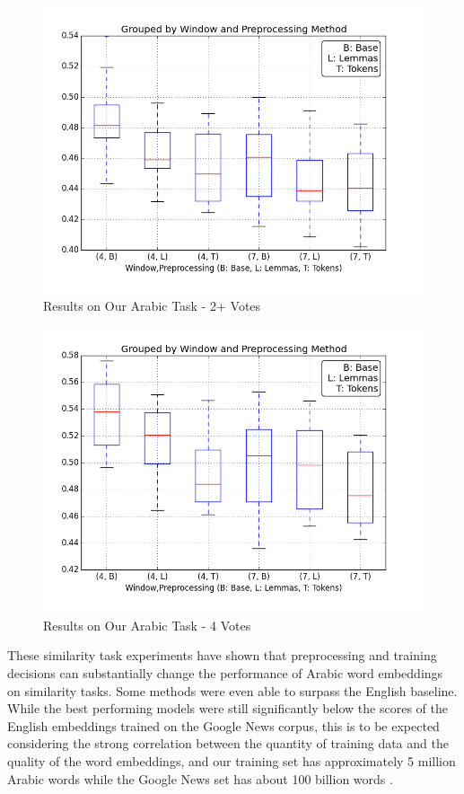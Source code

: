 \begin{figure}
  \includegraphics[width=\linewidth]{results_spearman/ar_similiarity_task_multi_results_spearplot.png}
  \caption{Results on Our Arabic Task - 2+ Votes}
  \label{fig:spearplot2}
\end{figure}

\begin{figure}
  \includegraphics[width=\linewidth]{results_spearman/ar_similiarity_task_4_votes_results_spearplot.png}
  \caption{Results on Our Arabic Task - 4 Votes}
  \label{fig:spearplot4}
\end{figure}



These similarity task experiments have shown that preprocessing and training decisions can substantially change the performance of Arabic word embeddings on similarity tasks. Some methods were even able to surpass the English baseline. While the best performing models were still significantly below the scores of the English embeddings trained on the Google News corpus, this is to be expected considering the strong correlation between the quantity of training data and the quality of the word embeddings, and our training set has approximately 5 million Arabic words while the Google News set has about 100 billion words \cite{mikolovdist:2013}.

